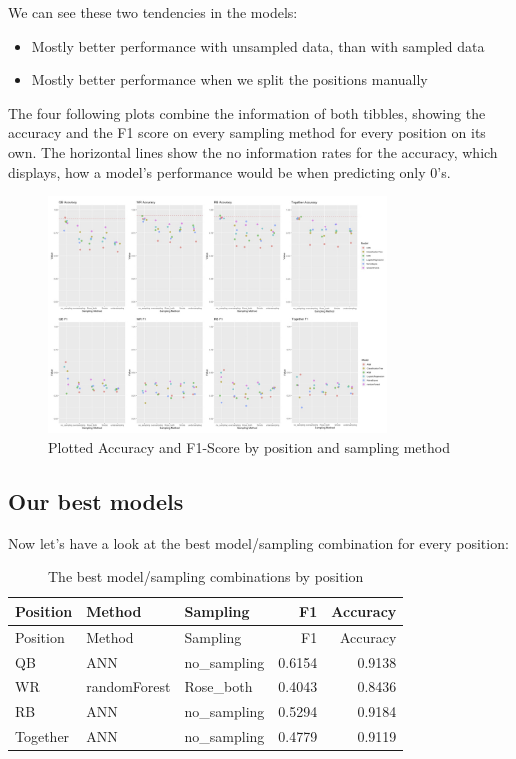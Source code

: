 \documentclass[]{article}
\providecommand{\tightlist}{%
  \setlength{\itemsep}{0pt}\setlength{\parskip}{0pt}}
\begin{document}
We can see these two tendencies in the models:

\begin{itemize}
\tightlist
\item
  Mostly better performance with unsampled data, than with sampled data
\item
  Mostly better performance when we split the positions manually
\end{itemize}

The four following plots combine the information of both tibbles,
showing the accuracy and the F1 score on every sampling method for every
position on its own. The horizontal lines show the no information rates
for the accuracy, which displays, how a model's performance would be
when predicting only 0's.

\newsection

\begin{figure}
\hypertarget{id}{%
\centering
\includegraphics[width=0.8\textwidth,height=\textheight]{Plots_8.jpg}
\caption{Plotted Accuracy and F1-Score by position and sampling
method}\label{id}
}
\end{figure}

\hypertarget{our-best-models}{%
\subsection{Our best models}\label{our-best-models}}

Now let's have a look at the best model/sampling combination for every
position:

\begin{longtable}[]{@{}lllrr@{}}
\caption{The best model/sampling combinations by
position}\tabularnewline
\toprule
Position & Method & Sampling & F1 & Accuracy\tabularnewline
\midrule
\endfirsthead
\toprule
Position & Method & Sampling & F1 & Accuracy\tabularnewline
\midrule
\endhead
QB & ANN & no\_sampling & 0.6154 & 0.9138\tabularnewline
WR & randomForest & Rose\_both & 0.4043 & 0.8436\tabularnewline
RB & ANN & no\_sampling & 0.5294 & 0.9184\tabularnewline
Together & ANN & no\_sampling & 0.4779 & 0.9119\tabularnewline
\bottomrule
\end{longtable}
\end{document}
